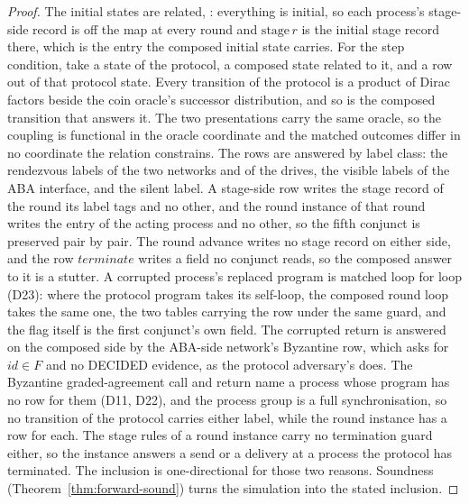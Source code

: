 \begin{proof}\leanok
  The initial states are related, : everything is initial, so each process's stage-side record is off the map at every round and $\mathrm{stage}\,r$ is the initial stage record there, which is the entry the composed initial state carries.
  For the step condition, take a state of the protocol, a composed state related to it, and a row out of that protocol state.
  Every transition of the protocol is a product of Dirac factors beside the coin oracle's successor distribution, and so is the composed transition that answers it.
  The two presentations carry the same oracle, so the coupling is functional in the oracle coordinate and the matched outcomes differ in no coordinate the relation constrains.
  The rows are answered by label class: the rendezvous labels of the two networks and of the drives, the visible labels of the ABA interface, and the silent label.
  A stage-side row writes the stage record of the round its label tags and no other, and the round instance of that round writes the entry of the acting process and no other, so the fifth conjunct is preserved pair by pair.
  The round advance writes no stage record on either side, and the row $terminate$ writes a field no conjunct reads, so the composed answer to it is a stutter.
  A corrupted process's replaced program is matched loop for loop (D23): where the protocol program takes its self-loop, the composed round loop takes the same one, the two tables carrying the row under the same guard, and the flag itself is the first conjunct's own field.
  The corrupted return is answered on the composed side by the ABA-side network's Byzantine row, which asks for $id \in F$ and no DECIDED evidence, as the protocol adversary's does.
  The Byzantine graded-agreement call and return name a process whose program has no row for them (D11, D22), and the process group is a full synchronisation, so no transition of the protocol carries either label, while the round instance has a row for each.
  The stage rules of a round instance carry no termination guard either, so the instance answers a send or a delivery at a process the protocol has terminated.
  The inclusion is one-directional for those two reasons.
  Soundness (Theorem~\ref{thm:forward-sound}) turns the simulation  into the stated inclusion.
\end{proof}
